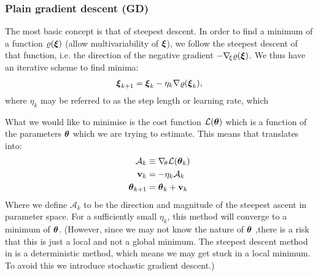     \subsubsection{Plain gradient descent (GD)}\label{sec:plain_gradient_descent}
        The most basic concept is that of steepest descent. In order to find a minimum of a function $\varrho(\boldsymbol{\xi})$ (allow multivariability of $\boldsymbol{\xi}$), we follow the steepest descent of that function, i.e. the direction of the negative gradient $-\nabla_{\!\xi} \varrho(\boldsymbol{\xi})$. We thus have an iterative scheme to find minima:
        \begin{align}\label{eq:steepest_descent}
            \boldsymbol{\xi}_{k+1} = \boldsymbol{\xi}_k - \eta_k\nabla \varrho(\boldsymbol{\xi}_k),
        \end{align}
        where $\eta_k$ may be referred to as the step length or learning rate, which \fillertext

        What we would like to minimise is the cost function $\mathcal{L}(\boldsymbol{\theta})$ which is a function of the parameters $\boldsymbol{\theta}$ which we are trying to estimate. This means that  translates into:
        \begin{align}\label{eq:steepest_descent_cost_function}
            \mathcal{A}_k &\equiv \nabla_{\!\theta} \mathcal{L}(\boldsymbol{\theta}_k) \nonumber \\
            \mathbf{v}_k &= -\eta_k\mathcal{A}_k \nonumber \\
            \boldsymbol{\theta}_{k+1} &= \boldsymbol{\theta}_k + \mathbf{v}_k
        \end{align}
        Where we define $\mathcal{A}_k$ to be the direction and magnitude of the steepest ascent in parameter space. 
        For a sufficiently small $\eta_k$, this method will converge to a minimum of $\boldsymbol{\theta}$. (However, since we may not know the nature of $\boldsymbol{\theta}$ ,there is a risk that this is just a local and not a global minimum. The steepest descent method in  is a deterministic method, which means we may get stuck in a local minimum. To avoid this we introduce stochastic gradient descent.) 

